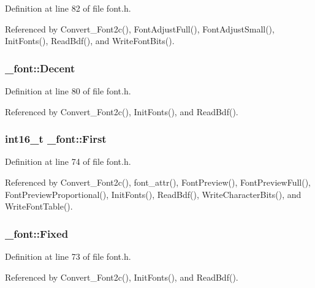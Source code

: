 Definition at line 82 of file font.\-h.



Referenced by Convert\-\_\-\-Font2c(), Font\-Adjust\-Full(), Font\-Adjust\-Small(), Init\-Fonts(), Read\-Bdf(), and Write\-Font\-Bits().

\hypertarget{struct__font_a7f3567884a6aa454b7414b10dba35755}{
\subsubsection[{Decent}]{ \-\_\-font\-::\-Decent}}\label{struct__font_a7f3567884a6aa454b7414b10dba35755}


Definition at line 80 of file font.\-h.



Referenced by Convert\-\_\-\-Font2c(), Init\-Fonts(), and Read\-Bdf().

\hypertarget{struct__font_a73decb2a2c2880dc782cd9cda5561876}{
\subsubsection[{First}]{\setlength{\rightskip}{0pt plus 5cm}int16\-\_\-t \-\_\-font\-::\-First}}\label{struct__font_a73decb2a2c2880dc782cd9cda5561876}


Definition at line 74 of file font.\-h.



Referenced by Convert\-\_\-\-Font2c(), font\-\_\-attr(), Font\-Preview(), Font\-Preview\-Full(), Font\-Preview\-Proportional(), Init\-Fonts(), Read\-Bdf(), Write\-Character\-Bits(), and Write\-Font\-Table().

\hypertarget{struct__font_a76218c6b35acb78926429f247cbaa687}{
\subsubsection[{Fixed}]{ \-\_\-font\-::\-Fixed}}\label{struct__font_a76218c6b35acb78926429f247cbaa687}


Definition at line 73 of file font.\-h.



Referenced by Convert\-\_\-\-Font2c(), Init\-Fonts(), and Read\-Bdf().

